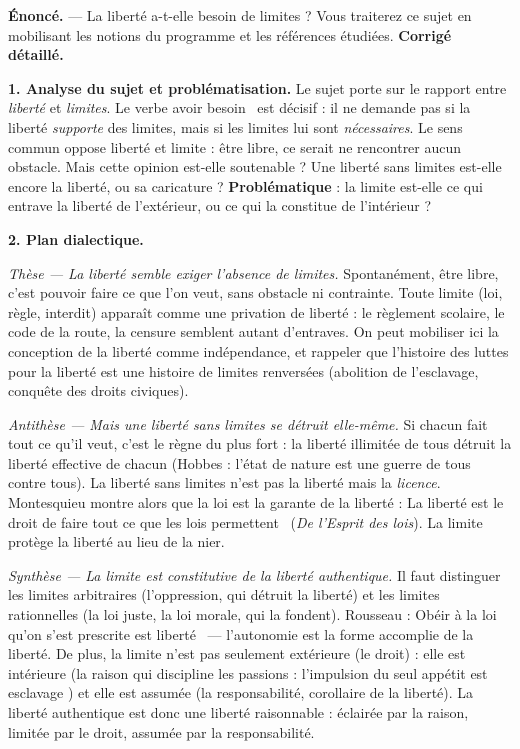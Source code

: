 \documentclass[11pt]{article}
\begin{document}
\begin{exoresolu}
\textbf{Énoncé.} — La liberté a-t-elle besoin de limites ? Vous traiterez ce sujet en mobilisant les notions du programme et les références étudiées.
\tcblower
\textbf{Corrigé détaillé.}

\textbf{1. Analyse du sujet et problématisation.} Le sujet porte sur le rapport entre \emph{liberté} et \emph{limites}. Le verbe \guillemotleft avoir besoin \guillemotright\ est décisif : il ne demande pas si la liberté \emph{supporte} des limites, mais si les limites lui sont \emph{nécessaires}. Le sens commun oppose liberté et limite : être libre, ce serait ne rencontrer aucun obstacle. Mais cette opinion est-elle soutenable ? Une liberté sans limites est-elle encore la liberté, ou sa caricature ? \textbf{Problématique} : la limite est-elle ce qui entrave la liberté de l'extérieur, ou ce qui la constitue de l'intérieur ?

\textbf{2. Plan dialectique.}

\emph{Thèse — La liberté semble exiger l'absence de limites.} Spontanément, être libre, c'est pouvoir faire ce que l'on veut, sans obstacle ni contrainte. Toute limite (loi, règle, interdit) apparaît comme une privation de liberté : le règlement scolaire, le code de la route, la censure semblent autant d'entraves. On peut mobiliser ici la conception de la liberté comme indépendance, et rappeler que l'histoire des luttes pour la liberté est une histoire de limites renversées (abolition de l'esclavage, conquête des droits civiques).

\emph{Antithèse — Mais une liberté sans limites se détruit elle-même.} Si chacun fait tout ce qu'il veut, c'est le règne du plus fort : la liberté illimitée de tous détruit la liberté effective de chacun (Hobbes : l'état de nature est une guerre de tous contre tous). La liberté sans limites n'est pas la liberté mais la \emph{licence}. Montesquieu montre alors que la loi est la garante de la liberté : \guillemotleft La liberté est le droit de faire tout ce que les lois permettent \guillemotright\ (\emph{De l'Esprit des lois}). La limite protège la liberté au lieu de la nier.

\emph{Synthèse — La limite est constitutive de la liberté authentique.} Il faut distinguer les limites arbitraires (l'oppression, qui détruit la liberté) et les limites rationnelles (la loi juste, la loi morale, qui la fondent). Rousseau : \guillemotleft Obéir à la loi qu'on s'est prescrite est liberté \guillemotright\ — l'autonomie est la forme accomplie de la liberté. De plus, la limite n'est pas seulement extérieure (le droit) : elle est intérieure (la raison qui discipline les passions : \guillemotleft l'impulsion du seul appétit est esclavage \guillemotright) et elle est assumée (la responsabilité, corollaire de la liberté). La liberté authentique est donc une liberté raisonnable : éclairée par la raison, limitée par le droit, assumée par la responsabilité.


\end{exoresolu}
\end{document}
